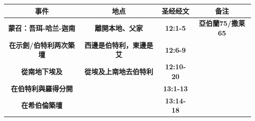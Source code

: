 \begin{table}[!hbp]
\begin{threeparttable}
\begin{tabular}{c c c c}
\toprule
 \multicolumn{1}{L{\dimexpr0.25\linewidth-1\tabcolsep\relax}}{\bfseries 事件} 
&\multicolumn{1}{L{\dimexpr0.2\linewidth-1\tabcolsep\relax}}{\bfseries 地点 }   
&\multicolumn{1}{L{\dimexpr0.1\linewidth-1\tabcolsep\relax}}{\bfseries 圣经经文}     
&\multicolumn{1}{L{\dimexpr0.2\linewidth-1\tabcolsep\relax}}{\bfseries  备注}  \\\hline

\multicolumn{1}{L{\dimexpr0.25\linewidth-1\tabcolsep\relax}}{\bfseries 蒙召：吾珥-哈兰-迦南} 
& \multicolumn{1}{L{\dimexpr0.25\linewidth-1\tabcolsep\relax}}{\bfseries 離開本地、父家} 
& \multicolumn{1}{L{\dimexpr0.1\linewidth-1\tabcolsep\relax}}{\bfseries 12:1-5}
& \multicolumn{1}{L{\dimexpr0.2\linewidth-1\tabcolsep\relax}}{\bfseries 亞伯蘭75/撒莱65}\\ 

\multicolumn{1}{L{\dimexpr0.25\linewidth-1\tabcolsep\relax}}{\bfseries 在示劍/伯特利两次築壇} 
& \multicolumn{1}{L{\dimexpr0.25\linewidth-1\tabcolsep\relax}}{\bfseries 西邊是伯特利，東邊是艾}  
& \multicolumn{1}{L{\dimexpr0.1\linewidth-1\tabcolsep\relax}}{\bfseries 12:6-9}
& \multicolumn{1}{L{\dimexpr0.2\linewidth-1\tabcolsep\relax}}{\bfseries }\\

\multicolumn{1}{L{\dimexpr0.25\linewidth-1\tabcolsep\relax}}{\bfseries 從南地下埃及} 
& \multicolumn{1}{L{\dimexpr0.25\linewidth-1\tabcolsep\relax}}{\bfseries 從埃及上南地去伯特利}   
& \multicolumn{1}{L{\dimexpr0.1\linewidth-1\tabcolsep\relax}}{\bfseries 12:10-20}
& \multicolumn{1}{L{\dimexpr0.2\linewidth-1\tabcolsep\relax}}{\bfseries }\\

\multicolumn{1}{L{\dimexpr0.25\linewidth-1\tabcolsep\relax}}{\bfseries 在伯特利與羅得分開} 
& \multicolumn{1}{L{\dimexpr0.2\linewidth-1\tabcolsep\relax}}{\bfseries } 
& \multicolumn{1}{L{\dimexpr0.1\linewidth-1\tabcolsep\relax}}{\bfseries 13:1-13}
& \multicolumn{1}{L{\dimexpr0.2\linewidth-1\tabcolsep\relax}}{\bfseries }\\

\multicolumn{1}{L{\dimexpr0.25\linewidth-1\tabcolsep\relax}}{\bfseries 在希伯倫築壇}  
& \multicolumn{1}{L{\dimexpr0.2\linewidth-1\tabcolsep\relax}}{\bfseries } 
& \multicolumn{1}{L{\dimexpr0.1\linewidth-1\tabcolsep\relax}}{\bfseries 13:14-18}
& \multicolumn{1}{L{\dimexpr0.2\linewidth-1\tabcolsep\relax}}{\bfseries }\\


\end{tabular}
\end{threeparttable}
\end{table}
